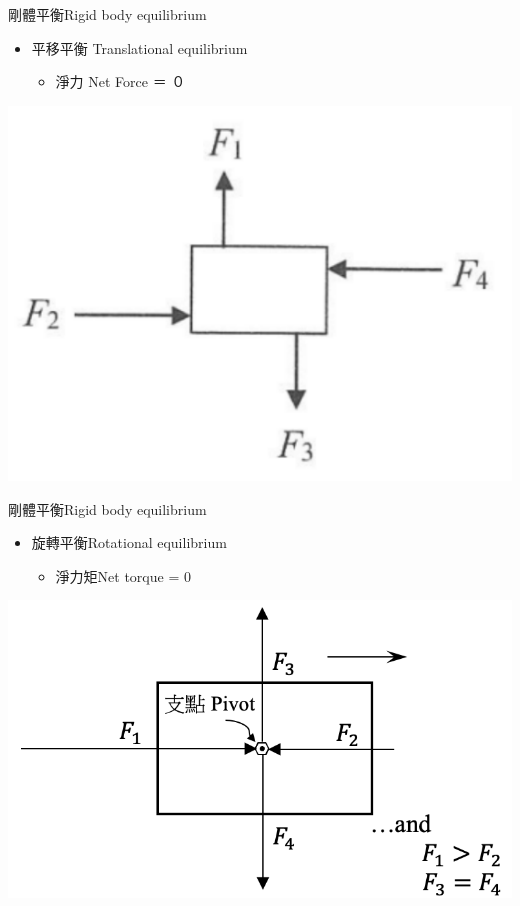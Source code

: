 \documentclass[beamer=true]{standalone}
\begin{document}
\begin{frame}{剛體平衡Rigid body equilibrium}
    \begin{itemize}
        \item 平移平衡 Translational equilibrium
              \begin{itemize}
                  \item 淨力 Net Force ＝ ０
              \end{itemize}
    \end{itemize}
    {\par\centering
    \includegraphics[width=.45\textwidth]{assets/e0f98693.png}

    \par}

\end{frame}
\begin{frame}{剛體平衡Rigid body equilibrium}
    \begin{itemize}
        \item 旋轉平衡Rotational equilibrium
              \begin{itemize}
                  \item 淨力矩Net torque = 0
              \end{itemize}
    \end{itemize}
    {\par\centering
    \includegraphics[width=.5\textwidth]{assets/4eeeca69.png}
    \par}

\end{frame}
\end{document}
